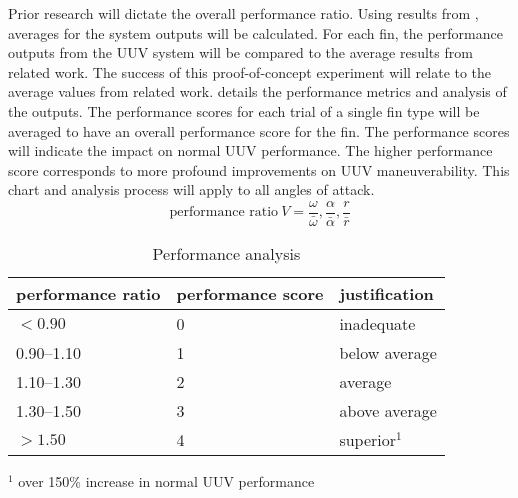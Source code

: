 \documentclass{IEEEtran}
\begin{document}
Prior research will dictate the overall performance ratio.  Using results from \cite{hiller2012expanding, berenice2018splash, orourke2020navy}, averages for the system outputs will be calculated.  For each fin, the performance outputs from the UUV system will be compared to the average results from related work.  The success of this proof-of-concept experiment will relate to the average values from related work.   details the performance metrics and analysis of the outputs.  The performance scores for each trial of a single fin type will be averaged to have an overall performance score for the fin.  The performance scores will indicate the impact on normal UUV performance.  The higher performance score corresponds to more profound improvements on UUV maneuverability.  This chart and analysis process will apply to all angles of attack.    
\begin{equation}
\mbox{performance ratio}\ V = \frac{\omega}{\bar{\omega}}, \frac{\alpha}{\bar{\alpha}}, \frac{r}{\bar{r}} 
\label{eq:performanceratio}
\end{equation}

\begin{table}
\caption{Performance analysis}
\label{tab:1}
\begin{center}
\begin{tabular}{lll}
\toprule
performance ratio & performance score & justification \\
\midrule 
$< \num{0.90}$ & 0 & inadequate \\
\numrange{0.90}{1.10} & 1 & below average \\
\numrange{1.10}{1.30} & 2 & average \\
\numrange{1.30}{1.50} & 3 & above average \\
$> \num{1.50}$ & 4 & superior$^1$\\
\bottomrule
\end{tabular}

\vspace{1em}
$^1$ over 150\% increase in normal UUV performance
\end{center}
\end{table}
\end{document}
